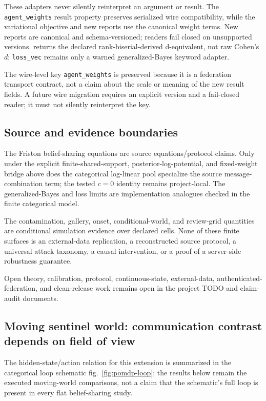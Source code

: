 \documentclass[
  english,
]{article}
\theoremstyle{plain}
\theoremstyle{definition}
\theoremstyle{remark}
\theoremstyle{definition}
\begin{document}
These adapters never silently reinterpret an argument or result. The
\texttt{agent\_weights} result property preserves serialized wire
compatibility, while the variational objective and new reports use the
canonical weight terms. New reports are canonical and schema-versioned;
readers fail closed on unsupported versions.
 returns the declared
rank-biserial-derived d-equivalent, not raw Cohen's \(d\);
\texttt{loss\_vec} remains only a warned generalized-Bayes keyword
adapter.

The wire-level key \texttt{agent\_weights} is preserved because it is a
federation transport contract, not a claim about the scale or meaning of
the new result fields. A future wire migration requires an explicit
version and a fail-closed reader; it must not silently reinterpret the
key.

\subsection{Source and evidence
boundaries}\label{source-and-evidence-boundaries}

The Friston belief-sharing equations are source equations/protocol
claims. Only under the explicit finite-shared-support,
posterior-log-potential, and fixed-weight bridge above does the
categorical log-linear pool specialize the source message-combination
term; the tested \(c=0\) identity remains project-local. The
generalized-Bayes and loss limits are implementation analogues checked
in the finite categorical model.

The contamination, gallery, onset, conditional-world, and review-grid
quantities are conditional simulation evidence over declared cells. None
of these finite surfaces is an external-data replication, a
reconstructed source protocol, a universal attack taxonomy, a causal
intervention, or a proof of a server-side robustness guarantee.

Open theory, calibration, protocol, continuous-state, external-data,
authenticated-federation, and clean-release work remains open in the
project TODO and claim-audit documents.

\subsection{Moving sentinel world: communication contrast depends on
field of view}\label{sec:results-moving}

The hidden-state/action relation for this extension is summarized in the
categorical loop schematic fig.~\ref{fig:pomdp-loop}; the results below
remain the executed moving-world comparisons, not a claim that the
schematic's full loop is present in every flat belief-sharing study.
\end{document}
